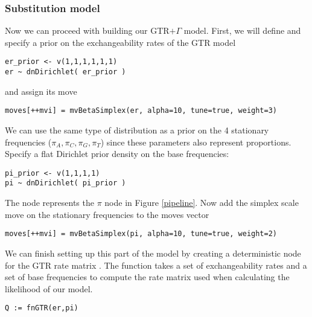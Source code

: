 \subsubsection{Substitution model}

Now we can proceed with building our GTR$+\Gamma$ model.
First, we will define and specify a prior on the exchangeability rates of the GTR model

{\tt \begin{snugshade*}
\begin{lstlisting}
er_prior <- v(1,1,1,1,1,1) 
er ~ dnDirichlet( er_prior )
\end{lstlisting}
\end{snugshade*}}

and assign its move

{\tt \begin{snugshade*}
\begin{lstlisting}
moves[++mvi] = mvBetaSimplex(er, alpha=10, tune=true, weight=3) 
\end{lstlisting}
\end{snugshade*}}

We can use the same type of distribution as a prior on the 4 stationary frequencies ($\pi_A, \pi_C, \pi_G, \pi_T$) since these parameters also represent proportions. 
Specify a flat Dirichlet prior density on the base frequencies:
{\tt \begin{snugshade*}
\begin{lstlisting}
pi_prior <- v(1,1,1,1) 
pi ~ dnDirichlet( pi_prior )
\end{lstlisting}
\end{snugshade*}}

The node  represents the $\pi$ node in Figure \ref{pipeline}.
Now add the simplex scale move on the stationary frequencies to the moves vector

{\tt \small \begin{snugshade*}
\begin{lstlisting}
moves[++mvi] = mvBetaSimplex(pi, alpha=10, tune=true, weight=2) 
\end{lstlisting}
\end{snugshade*}}

We can finish setting up this part of the model by creating a deterministic node for the GTR rate matrix . 
The  function takes a set of exchangeability rates and a set of base frequencies to compute the rate matrix used when calculating the likelihood of our model.
{\tt \begin{snugshade*}
\begin{lstlisting}
Q := fnGTR(er,pi)
\end{lstlisting}
\end{snugshade*}}



